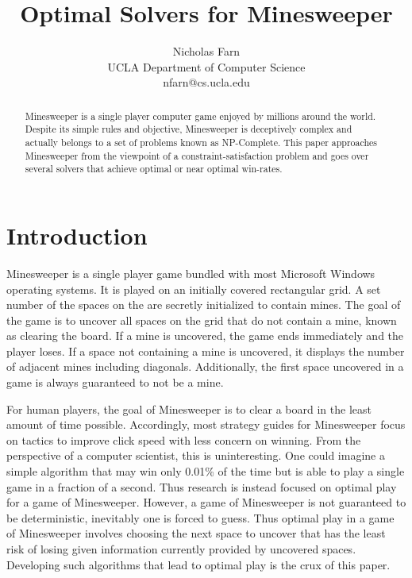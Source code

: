 \documentclass[letterpaper]{article}
\title{Optimal Solvers for Minesweeper}
\author{Nicholas Farn\\ UCLA Department of Computer Science \\ nfarn@cs.ucla.edu}
\begin{document}
\maketitle

\begin{abstract}
Minesweeper is a single player computer game enjoyed by millions around the world.  Despite its simple rules and objective, Minesweeper is deceptively complex and actually belongs to a set of problems known as NP-Complete.  This paper approaches Minesweeper from the viewpoint of a constraint-satisfaction problem and goes over several solvers that achieve optimal or near optimal win-rates.
\end{abstract}

\section{Introduction}
Minesweeper is a single player game bundled with most Microsoft Windows operating systems.  It is played on an initially covered rectangular grid.  A set number of the spaces on the are secretly initialized to contain mines.  The goal of the game is to uncover all spaces on the grid that do not contain a mine, known as clearing the board.  If a mine is uncovered, the game ends immediately and the player loses.  If a space not containing a mine is uncovered, it displays the number of adjacent mines including diagonals.  Additionally, the first space uncovered in a game is always guaranteed to not be a mine.

For human players, the goal of Minesweeper is to clear a board in the least amount of time possible.  Accordingly, most strategy guides for Minesweeper focus on tactics to improve click speed with less concern on winning.  From the perspective of a computer scientist, this is uninteresting.  One could imagine a simple algorithm that may win only 0.01\% of the time but is able to play a single game in a fraction of a second.  Thus research is instead focused on optimal play for a game of Minesweeper.  However, a game of Minesweeper is not guaranteed to be deterministic, inevitably one is forced to guess.  Thus optimal play in a game of Minesweeper involves choosing the next space to uncover that has the least risk of losing given information currently provided by uncovered spaces.  Developing such algorithms that lead to optimal play is the crux of this paper.
\end{document}
